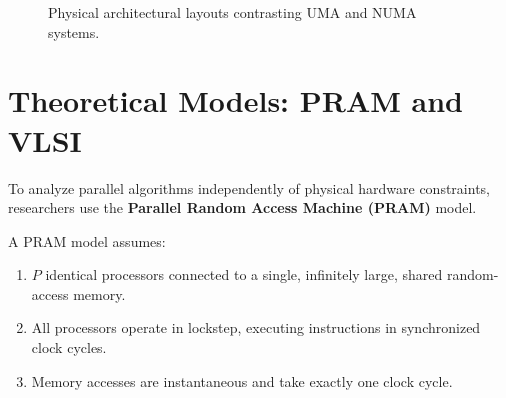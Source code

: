 \documentclass[12pt,a4paper,openany]{book}
\begin{document}
\begin{figure}[htbp]
{%
    }
    \caption{Physical architectural layouts contrasting UMA and NUMA systems.}
    \label{fig:uma_vs_numa}
\end{figure}

\section{Theoretical Models: PRAM and VLSI}
To analyze parallel algorithms independently of physical hardware constraints, researchers use the \textbf{Parallel Random Access Machine (PRAM)} model.

A PRAM model assumes:
\begin{enumerate}
    \item $P$ identical processors connected to a single, infinitely large, shared random-access memory.
    \item All processors operate in lockstep, executing instructions in synchronized clock cycles.
    \item Memory accesses are instantaneous and take exactly one clock cycle.
\end{enumerate}
\end{document}
